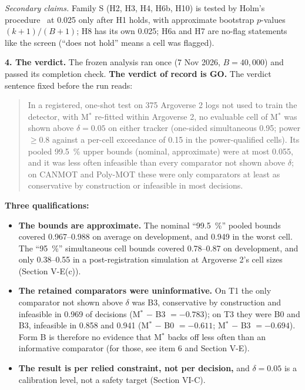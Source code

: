 \documentclass{ieeeaccess}
\begin{document}
\emph{Secondary claims.} Family S (H2, H3, H4, H6b, H10) is tested by Holm's procedure~\cite{Holm1979} at 0.025 only after H1 holds, with approximate bootstrap $p$-values $(k + 1)/(B + 1)$; H8 has its own 0.025; H6a and H7 are no-flag statements like the screen (``does not hold'' means a cell was flagged).

\textbf{4. The verdict.} The frozen analysis ran once (7 Nov 2026, $B = 40{,}000$) and passed its completion check. \textbf{The verdict of record is GO.} The verdict sentence fixed before the run reads:

\begin{quote}
In a registered, one-shot test on 375 Argoverse 2 logs not used to train the detector, with M$^{*}$ re-fitted within Argoverse 2, no evaluable cell of M$^{*}$ was shown above $\delta = 0.05$ on either tracker (one-sided simultaneous 0.95; power $\geq 0.8$ against a per-cell exceedance of 0.15 in the power-qualified cells). Its pooled 99.5~\% upper bounds (nominal, approximate) were at most 0.055, and it was less often infeasible than every comparator not shown above $\delta$; on CANMOT and Poly-MOT these were only comparators at least as conservative by construction or infeasible in most decisions.
\end{quote}

\textbf{Three qualifications:}

\begin{itemize}
\item \textbf{The bounds are approximate.} The nominal ``99.5~\%'' pooled bounds covered 0.967--0.988 on average on development, and 0.949 in the worst cell. The ``95~\%'' simultaneous cell bounds covered 0.78--0.87 on development, and only 0.38--0.55 in a post-registration simulation at Argoverse 2's cell sizes (Section V-E(c)).
\item \textbf{The retained comparators were uninformative.} On T1 the only comparator not shown above $\delta$ was B3, conservative by construction and infeasible in 0.969 of decisions (M$^{*}$ $-$ B3 $= -0.783$); on T3 they were B0 and B3, infeasible in 0.858 and 0.941 (M$^{*}$ $-$ B0 $= -0.611$; M$^{*}$ $-$ B3 $= -0.694$). Form B is therefore no evidence that M$^{*}$ backs off less often than an informative comparator (for those, see item 6 and Section V-E).
\item \textbf{The result is per relied constraint, not per decision,} and $\delta = 0.05$ is a calibration level, not a safety target (Section VI-C).
\end{itemize}
\end{document}
